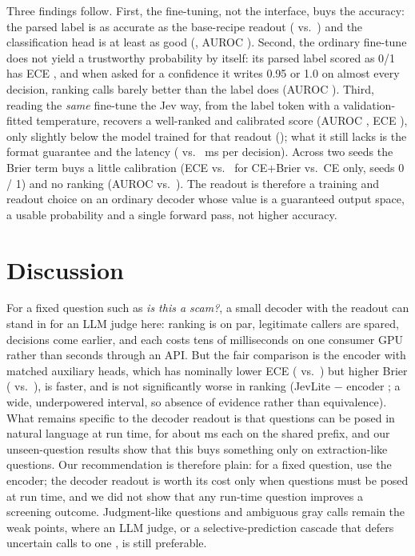 \documentclass[11pt]{article}
\begin{document}
Three findings follow. First, the fine-tuning, not the interface, buys the accuracy: the parsed label is as accurate as the base-recipe readout (\armAlabacc{} vs.\ \armBacc{}) and the classification head is at least as good (\armCacc{}, AUROC \armCauroc{}). Second, the ordinary fine-tune does not yield a trustworthy probability by itself: its parsed label scored as 0/1 has ECE \armAlabece{}, and when asked for a confidence it writes 0.95 or 1.0 on almost every decision, ranking calls barely better than the label does (AUROC \armAverbauroc{}). Third, reading the \emph{same} fine-tune the Jev way, from the label token with a validation-fitted temperature, recovers a well-ranked and calibrated score (AUROC \armAfirstauroc{}, ECE \armAfirstece{}), only slightly below the model trained for that readout (\armBauroc{}); what it still lacks is the format guarantee and the latency (\armAlabms{} vs.\ \armBmsMeasured{} ms per decision). Across two seeds the Brier term buys a little calibration (ECE \armBseedece{} vs.\ \armBceseedece{} for CE+Brier vs.\ CE only, seeds 0 / 1) and no ranking (AUROC \armBseedauroc{} vs.\ \armBceseedauroc). The readout is therefore a training and readout choice on an ordinary decoder whose value is a guaranteed output space, a usable probability and a single forward pass, not higher accuracy.

\section{Discussion}

For a fixed question such as \emph{is this a scam?}, a small decoder with the readout can stand in for an LLM judge here: ranking is on par, legitimate callers are spared, decisions come earlier, and each costs tens of milliseconds on one consumer GPU rather than seconds through an API. But the fair comparison is the encoder with matched auxiliary heads, which has nominally lower ECE (\mbauxece{} vs.\ \jlece) but higher Brier (\mbauxbrier{} vs.\ \jlbrier), is faster, and is not significantly worse in ranking (JevLite $-$ encoder \mbauxdelta{} \mbauxdeltaci; a wide, underpowered interval, so absence of evidence rather than equivalence). What remains specific to the decoder readout is that questions can be posed in natural language at run time, for about \latextra{} ms each on the shared prefix, and our unseen-question results show that this buys something only on extraction-like questions. Our recommendation is therefore plain: for a fixed question, use the encoder; the decoder readout is worth its cost only when questions must be posed at run time, and we did not show that any run-time question improves a screening outcome. Judgment-like questions and ambiguous gray calls remain the weak points, where an LLM judge, or a selective-prediction cascade that defers uncertain calls to one \citep{geifman2017selective}, is still preferable.
\end{document}
